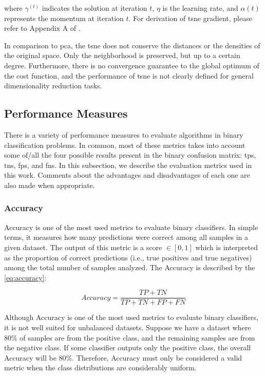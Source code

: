 \noindent
where $\gamma^{(t)}$ indicates the solution at iteration $t$, $\eta$ is the learning rate, and $\alpha(t)$ represents the momentum at iteration $t$. For derivation of \acs{tsne} gradient, please refer to Appendix A of \citep{tsne}. 

In comparison to \acs{pca}, the \acs{tsne} does not conserve the distances or the densities of the original space. Only the neighborhood is preserved, but up to a certain degree. Furthermore, there is no convergence guarantee to the global optimum of the cost function, and the performance of \acs{tsne} is not clearly defined for general dimensionality reduction tasks. 


\subsection{Performance Measures} \label{sec:measures}

There is a variety of performance measures to evaluate algorithms in binary classification problems. In common, most of these metrics takes into account some of/all the four possible results present in the binary confusion matrix: \acfp{tp}, \acfp{tn}, \acfp{fp}, and \acfp{fn}. In this subsection, we describe the evaluation metrics used in this work. Comments about the advantages and disadvantages of each one are also made when appropriate. 

\subsubsection{Accuracy}

Accuracy is one of the most used metrics to evaluate binary classifiers. In simple terms, it measures how many predictions were correct among all samples in a given dataset. The output of this metric is a score $\in [0, 1]$ which is interpreted as the proportion of correct predictions (i.e., true positives and true negatives) among the total number of samples analyzed. The Accuracy is described by the \autoref{eq:accuracy}:

\begin{equation}
\label{eq:accuracy}
Accuracy = \frac{TP + TN}{TP + TN + FP + FN}
\end{equation}

Although Accuracy is one of the most used metrics to evaluate binary classifiers, it is not well suited for unbalanced datasets. Suppose we have a dataset where 80\% of samples are from the positive class, and the remaining samples are from the negative class. If some classifier outputs only the positive class, the overall Accuracy will be 80\%. Therefore, Accuracy must only be considered a valid metric when the class distributions are considerably uniform.

